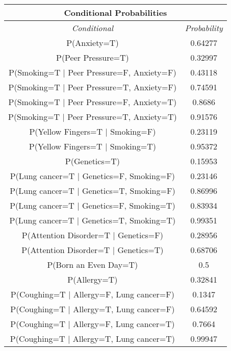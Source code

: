 \documentclass{article}
\begin{document}
\begin{table}[h]
    \centering
    \begin{tabular}{|c|c|}
        \hline
        \multicolumn{2}{|c|}{\textbf{Conditional Probabilities}} \\
        \hline
        \textit{Conditional} & \textit{Probability} \\
        \hline
        P(Anxiety=T) & 0.64277 \\ \hline
        P(Peer Pressure=T) & 0.32997 \\ \hline
        P(Smoking=T $\vert$ Peer Pressure=F, Anxiety=F) & 0.43118 \\ \hline
        P(Smoking=T $\vert$ Peer Pressure=T, Anxiety=F) & 0.74591 \\ \hline
        P(Smoking=T $\vert$ Peer Pressure=F, Anxiety=T) & 0.8686 \\ \hline
        P(Smoking=T $\vert$ Peer Pressure=T, Anxiety=T) & 0.91576 \\ \hline
        P(Yellow Fingers=T $\vert$ Smoking=F) & 0.23119 \\ \hline
        P(Yellow Fingers=T $\vert$ Smoking=T) & 0.95372 \\ \hline
        P(Genetics=T) & 0.15953 \\ \hline
        P(Lung cancer=T $\vert$ Genetics=F, Smoking=F) & 0.23146 \\ \hline
        P(Lung cancer=T $\vert$ Genetics=T, Smoking=F) & 0.86996 \\ \hline
        P(Lung cancer=T $\vert$ Genetics=F, Smoking=T) & 0.83934 \\ \hline
        P(Lung cancer=T $\vert$ Genetics=T, Smoking=T) & 0.99351 \\ \hline
        P(Attention Disorder=T $\vert$ Genetics=F) & 0.28956 \\ \hline
        P(Attention Disorder=T $\vert$ Genetics=T) & 0.68706 \\ \hline
        P(Born an Even Day=T) & 0.5 \\ \hline
        P(Allergy=T) & 0.32841 \\ \hline
        P(Coughing=T $\vert$ Allergy=F, Lung cancer=F) & 0.1347 \\ \hline
        P(Coughing=T $\vert$ Allergy=T, Lung cancer=F) & 0.64592 \\ \hline
        P(Coughing=T $\vert$ Allergy=F, Lung cancer=T) & 0.7664 \\ \hline
        P(Coughing=T $\vert$ Allergy=T, Lung cancer=T) & 0.99947 \\ \hline

\end{tabular}
\end{table}
\end{document}
